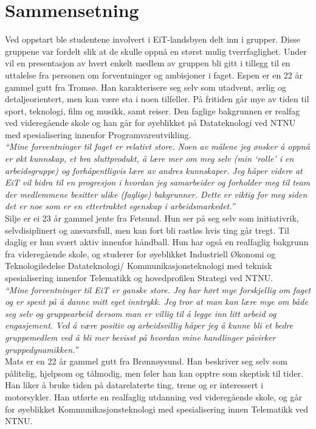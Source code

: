 \section{Sammensetning}
\label{sec:sammensetning}
Ved oppstart ble studentene involvert i EiT-landsbyen delt inn i grupper. Disse gruppene var fordelt slik at de skulle oppnå en størst mulig tverrfaglighet. Under vil en presentasjon av hvert enkelt medlem av gruppen bli gitt i tillegg til en uttalelse fra personen om forventninger og ambisjoner i faget.
Espen er en 22 år gammel gutt fra Tromsø. Han karakterisere seg selv som utadvent, ærlig og detaljeorientert, men kan være sta i noen tilfeller. På fritiden går mye av tiden til sport, teknologi, film og musikk, samt reiser. Den faglige bakgrunnen er realfag ved videregående skole og han går for øyeblikket på Datateknologi ved NTNU med spesialisering innenfor Programvareutvikling.\\

\textit{``Mine forventninger til faget er relativt store. Noen av målene jeg ønsker å oppnå er økt kunnskap, et bra sluttprodukt, å lære mer om meg selv (min `rolle' i en arbeidsgruppe) og forhåpentligvis lære av andres kunnskaper. Jeg håper videre at EiT vil bidra til en progresjon i hvordan jeg samarbeider og forholder meg til team der medlemmene besitter ulike (faglige) bakgrunner. Dette er viktig for meg siden det er noe som er en ettertraktet egenskap i arbeidsmarkedet.''}\\

Silje er ei 23 år gammel jente fra Fetsund. Hun ser på seg selv som initiativrik, selvdisiplinert og ansvarsfull, men kan fort bli rastløs hvis ting går tregt. Til daglig er hun svært aktiv innenfor håndball. Hun har også en realfaglig bakgrunn fra videregående skole, og studerer for øyeblikket Industriell Økonomi og Teknologiledelse Datateknologi/ Kommunikasjonsteknologi med teknisk spesialisering innenfor Telematikk og hovedprofilen Strategi ved NTNU.\\

\textit{``Mine forventninger til EiT er ganske store. Jeg har hørt mye forskjellig om faget og er spent på å danne mitt eget inntrykk. Jeg tror at man kan lære mye om både seg selv og gruppearbeid dersom man er villig til å legge inn litt arbeid og engasjement. Ved å være positiv og arbeidsvillig håper jeg å kunne bli et bedre gruppemedlem ved å bli mer bevisst på hvordan mine handlinger påvirker gruppedynamikken.''}\\

Mats er en 22 år gammel gutt fra Brønnøysund. Han beskriver seg selv som pålitelig, hjelpsom og tålmodig, men føler han kan opptre som skeptisk til tider. Han liker å bruke tiden på datarelaterte ting, trene og er interessert i motorsykler. Han utførte en realfaglig utdanning ved videregående skole, og går for øyeblikket Kommunikasjonsteknologi med spesialisering innen Telematikk ved NTNU.\\

